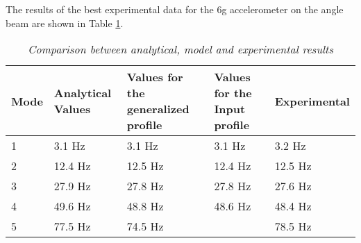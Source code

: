 %
%

\indent The results of the best experimental data for the 6g
 accelerometer on the angle beam are shown in Table
  \ref{tab:Results_Comp}.\\
\begin{table}
\begin{center}
    \begin{tabular}{|l| p{3.5cm}| p{3cm}| p{3cm}| p{3cm}|}
    \hline
    \textbf{Mode} & \textbf{Analytical Values} & \textbf{Values for the generalized profile} & \textbf{Values for the Input profile} & \textbf{Experimental} \\\hline
    1    & 3.1 Hz            & 3.1 Hz                             & 3.1 Hz                       & 3.2 Hz       \\\hline
    2    & 12.4 Hz           & 12.5 Hz                            & 12.4 Hz                      & 12.5 Hz      \\\hline
    3    & 27.9 Hz           & 27.8 Hz                            & 27.8 Hz                      & 27.6 Hz      \\\hline
    4    & 49.6 Hz           & 48.8 Hz                            & 48.6 Hz                      & 48.4 Hz      \\\hline
    5    & 77.5 Hz           & 74.5 Hz                            &                             & 78.5 Hz      \\\hline
    \end{tabular}
    \caption{\textit{Comparison between analytical, model and experimental results}}
    \label{tab:Results_Comp}
\end{center}
\end{table}
